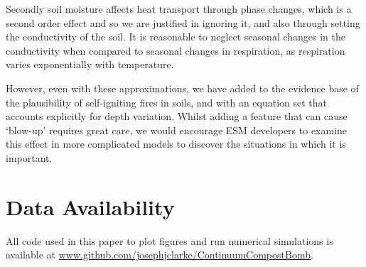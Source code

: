 Secondly soil moisture affects heat transport through phase changes, which is a second order effect and so we are justified in ignoring it, and also through setting the conductivity of the soil.
It is reasonable to neglect seasonal changes in the conductivity
when compared to seasonal changes in respiration, as respiration varies exponentially with temperature.

However, even with these approximations, we have added to the evidence base of the plausibility of self-igniting fires in soils, and with an equation set that accounts explicitly for depth variation.
Whilst adding a feature that can cause `blow-up' requires great care, we would encourage ESM developers to examine this effect in more complicated models to discover the situations in which it is important.

\section{Data Availability}
All code used in this paper to plot figures and run numerical simulations is available at \url{www.github.com/josephjclarke/ContinuumCompostBomb}.


